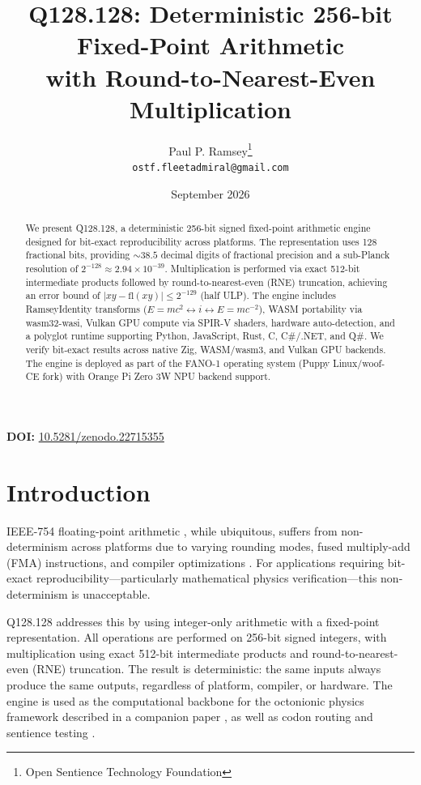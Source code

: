 \documentclass[11pt]{article}
\title{Q128.128: Deterministic 256-bit Fixed-Point Arithmetic \\
with Round-to-Nearest-Even Multiplication}
\author{
Paul P. Ramsey\thanks{Open Sentience Technology Foundation} \\
\texttt{ostf.fleetadmiral@gmail.com}
}
\date{September 2026}
\begin{document}
\maketitle

\noindent\textbf{DOI:} \href{https://doi.org/10.5281/zenodo.22715355}{10.5281/zenodo.22715355}

\begin{abstract}
We present Q128.128, a deterministic 256-bit signed fixed-point arithmetic engine designed for bit-exact reproducibility across platforms. The representation uses 128 fractional bits, providing $\sim 38.5$ decimal digits of fractional precision and a sub-Planck resolution of $2^{-128} \approx 2.94 \times 10^{-39}$. Multiplication is performed via exact 512-bit intermediate products followed by round-to-nearest-even (RNE) truncation, achieving an error bound of $|xy - \mathrm{fl}(xy)| \leq 2^{-129}$ (half ULP). The engine includes RamseyIdentity transforms ($E = mc^2 \leftrightarrow i \leftrightarrow E = mc^{-2}$), WASM portability via wasm32-wasi, Vulkan GPU compute via SPIR-V shaders, hardware auto-detection, and a polyglot runtime supporting Python, JavaScript, Rust, C, C\#/.NET, and Q\#. We verify bit-exact results across native Zig, WASM/wasm3, and Vulkan GPU backends. The engine is deployed as part of the FANO-1 operating system (Puppy Linux/woof-CE fork) with Orange Pi Zero 3W NPU backend support.
\end{abstract}

\tableofcontents
\newpage

\section{Introduction}

IEEE-754 floating-point arithmetic \cite{ieee754_2019}, while ubiquitous, suffers from non-determinism across platforms due to varying rounding modes, fused multiply-add (FMA) instructions, and compiler optimizations \cite{goldberg_1991, monniaux_2008}. For applications requiring bit-exact reproducibility---particularly mathematical physics verification---this non-determinism is unacceptable.

Q128.128 addresses this by using integer-only arithmetic with a fixed-point representation. All operations are performed on 256-bit signed integers, with multiplication using exact 512-bit intermediate products and round-to-nearest-even (RNE) truncation. The result is deterministic: the same inputs always produce the same outputs, regardless of platform, compiler, or hardware. The engine is used as the computational backbone for the octonionic physics framework described in a companion paper \cite{ramsey2026framework}, as well as codon routing \cite{ramsey2026codon} and sentience testing \cite{ramsey2026neuraleak}.
\end{document}
